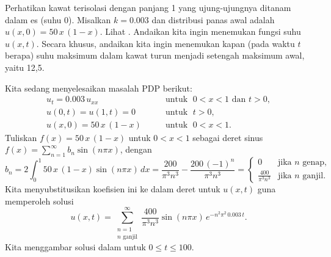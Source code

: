 \begin{example}
Perhatikan
kawat terisolasi dengan panjang 1 yang
ujung-ujungnya ditanam dalam es (suhu 0).
Misalkan $k=0.003$ dan distribusi panas awal
adalah $u(x,0) = 50\,x\,(1-x)$.
Lihat .
Andaikan kita ingin menemukan fungsi suhu $u(x,t)$.
Secara khusus, andaikan kita
ingin menemukan kapan (pada waktu $t$ berapa)
suhu maksimum dalam kawat 
turun menjadi setengah maksimum awal, yaitu 12,5.

\begin{myfig}
\capstart
{}
\caption{Distribusi awal suhu dalam
kawat.\label{heat:wireexinitfig}}
\end{myfig}

Kita sedang menyelesaikan masalah PDP berikut:
\begin{equation*}
\begin{array}{ll}
u_t = 0.003 \, u_{xx} & \qquad \text{untuk } \; 0 < x < 1 \text{ dan } t > 0, \\
u(0,t) = u(1,t) = 0 & \qquad \text{untuk } \; t > 0, \\
u(x,0) = 50\,x\,(1-x) & \qquad \text{untuk } \; 0 < x < 1 .
\end{array}
\end{equation*}
Tuliskan $f(x) = 50\,x\,(1-x)$ untuk $0 < x < 1$ sebagai deret sinus
$f(x) = \sum_{n=1}^\infty b_n \sin (n \pi x)$,
dengan
\begin{equation*}
b_n = 2 \int_0^1 50\,x\,(1-x) \sin (n \pi x) \,dx
= 
\frac{200}{{\pi }^{3}{n}^{3}}-\frac{200\,{\left( -1\right) }^{n}}{{\pi }^{3}{n}^{3}}
=
\begin{cases}
0 & \text{jika } n \text{ genap} , \\
\frac{400}{\pi^3 n^3} & \text{jika } n \text{ ganjil} .
\end{cases}
\end{equation*}
Kita menyubstitusikan koefisien ini ke dalam deret untuk $u(x,t)$ guna memperoleh
solusi
\begin{equation*}
u(x,t) = 
\sum_{\substack{n=1 \\ n \text{ ganjil}}}^\infty
\frac{400}{\pi^3 n^3}
\sin (n \pi x )
\, e^{-n^2 \pi^2 \, 0.003 \, t} .
\end{equation*}
Kita menggambar solusi
dalam  untuk $0 \leq t \leq 100$.


\end{example}
